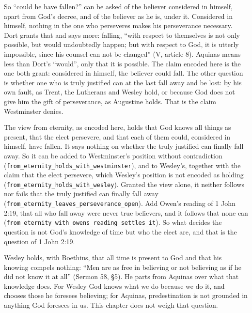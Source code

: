 \documentclass[11pt]{article}
\begin{document}
So “could he have fallen?” can be asked of the believer considered in himself, apart from God’s decree, and of the believer as he is, under it. Considered in himself, nothing in the one who perseveres makes his perseverance necessary. Dort grants that and says more: falling, “with respect to themselves is not only possible, but would undoubtedly happen; but with respect to God, it is utterly impossible, since his counsel can not be changed” (V, article 8). Aquinas means less than Dort’s “would”, only that it is possible. The claim encoded here is the one both grant: considered in himself, the believer could fall. The other question is whether one who is truly justified can at the last fall away and be lost: by his own fault, as Trent, the Lutherans and Wesley hold, or because God does not give him the gift of perseverance, as Augustine holds. That is the claim Westminster denies.

The view from eternity, as encoded here, holds that God knows all things as present, that the elect persevere, and that each of them could, considered in himself, have fallen. It says nothing on whether the truly justified can finally fall away. So it can be added to Westminster’s position without contradiction (\texttt{from\_\allowbreak{}eternity\_\allowbreak{}holds\_\allowbreak{}with\_\allowbreak{}westminster}), and to Wesley’s, together with the claim that the elect persevere, which Wesley’s position is not encoded as holding (\texttt{from\_\allowbreak{}eternity\_\allowbreak{}holds\_\allowbreak{}with\_\allowbreak{}wesley}). Granted the view alone, it neither follows nor fails that the truly justified can finally fall away (\texttt{from\_\allowbreak{}eternity\_\allowbreak{}leaves\_\allowbreak{}perseverance\_\allowbreak{}open}). Add Owen’s reading of 1 John 2:19, that all who fall away were never true believers, and it follows that none can (\texttt{from\_\allowbreak{}eternity\_\allowbreak{}with\_\allowbreak{}owens\_\allowbreak{}reading\_\allowbreak{}settles\_\allowbreak{}it}). So what decides the question is not God’s knowledge of time but who the elect are, and that is the question of 1 John 2:19.

Wesley holds, with Boethius, that all time is present to God and that his knowing compels nothing: “Men are as free in believing or not believing as if he did not know it at all” (Sermon 58, §5). He parts from Aquinas over what that knowledge does. For Wesley God knows what we do because we do it, and chooses those he foresees believing; for Aquinas, predestination is not grounded in anything God foresees in us. This chapter does not weigh that question.
\end{document}
